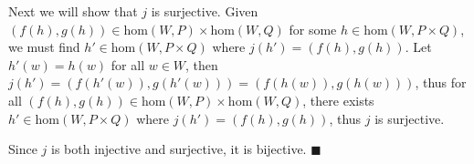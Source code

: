 \documentclass[11pt]{article}
\begin{document}
\begin{itemize}
    Next we will show that $j$ is surjective. Given $(f(h),g(h))\in\text{hom}(W,P)\times\text{hom}(W,Q)$ for some $h\in\text{hom}(W,P\times Q)$, we must find $h'\in\text{hom}(W,P\times Q)$ where $j(h')=(f(h),g(h))$. Let $h'(w)=h(w)$ for all $w\in W$, then $j(h')=(f(h'(w)),g(h'(w)))=(f(h(w)),g(h(w)))$, thus for all $(f(h),g(h))\in\text{hom}(W,P)\times\text{hom}(W,Q)$, there exists $h'\in\text{hom}(W,P\times Q)$ where $j(h')=(f(h),g(h))$, thus $j$ is surjective.

    Since $j$ is both injective and surjective, it is bijective. $\blacksquare$
\end{itemize}
\end{document}
